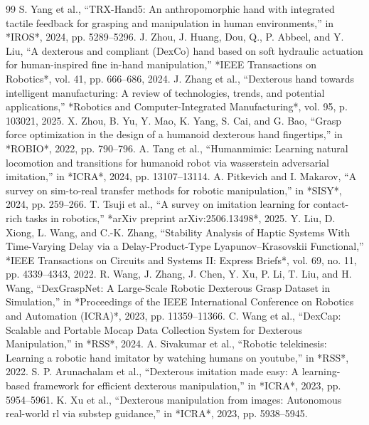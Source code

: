 \documentclass[letterpaper,journal]{IEEEtran}
\begin{document}

\begin{thebibliography}{99}
 S. Yang et al., ``TRX-Hand5: An anthropomorphic hand with integrated tactile feedback for grasping and manipulation in human environments,'' in *IROS*, 2024, pp. 5289--5296.
 J. Zhou, J. Huang, Dou, Q., P. Abbeel, and Y. Liu, ``A dexterous and compliant (DexCo) hand based on soft hydraulic actuation for human-inspired fine in-hand manipulation,'' *IEEE Transactions on Robotics*, vol. 41, pp. 666--686, 2024.
 J. Zhang et al., ``Dexterous hand towards intelligent manufacturing: A review of technologies, trends, and potential applications,'' *Robotics and Computer-Integrated Manufacturing*, vol. 95, p. 103021, 2025.
 X. Zhou, B. Yu, Y. Mao, K. Yang, S. Cai, and G. Bao, ``Grasp force optimization in the design of a humanoid dexterous hand fingertips,'' in *ROBIO*, 2022, pp. 790--796.
 A. Tang et al., ``Humanmimic: Learning natural locomotion and transitions for humanoid robot via wasserstein adversarial imitation,'' in *ICRA*, 2024, pp. 13107--13114.
 A. Pitkevich and I. Makarov, ``A survey on sim-to-real transfer methods for robotic manipulation,'' in *SISY*, 2024, pp. 259--266.
 T. Tsuji et al., ``A survey on imitation learning for contact-rich tasks in robotics,'' *arXiv preprint arXiv:2506.13498*, 2025.
 Y. Liu, D. Xiong, L. Wang, and C.-K. Zhang, ``Stability Analysis of Haptic Systems With Time-Varying Delay via a Delay-Product-Type Lyapunov–Krasovskii Functional,'' *IEEE Transactions on Circuits and Systems II: Express Briefs*, vol. 69, no. 11, pp. 4339--4343, 2022.
 R. Wang, J. Zhang, J. Chen, Y. Xu, P. Li, T. Liu, and H. Wang, ``DexGraspNet: A Large-Scale Robotic Dexterous Grasp Dataset in Simulation,'' in *Proceedings of the IEEE International Conference on Robotics and Automation (ICRA)*, 2023, pp. 11359--11366.
 C. Wang et al., ``DexCap: Scalable and Portable Mocap Data Collection System for Dexterous Manipulation,'' in *RSS*, 2024.
 A. Sivakumar et al., ``Robotic telekinesis: Learning a robotic hand imitator by watching humans on youtube,'' in *RSS*, 2022.
 S. P. Arunachalam et al., ``Dexterous imitation made easy: A learning-based framework for efficient dexterous manipulation,'' in *ICRA*, 2023, pp. 5954--5961.
 K. Xu et al., ``Dexterous manipulation from images: Autonomous real-world rl via substep guidance,'' in *ICRA*, 2023, pp. 5938--5945.

\end{thebibliography}
\end{document}
